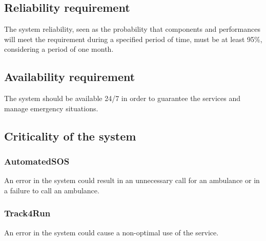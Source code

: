 \subsection{Reliability requirement}
The system reliability, seen as the probability that components and performances will meet the requirement during a specified period of time, must be at least 95\%, considering a period of one month.

\subsection{Availability requirement}
The system should be available 24/7 in order to guarantee the services and manage emergency situations.

\subsection{Criticality of the system}
\subsubsection{AutomatedSOS}
An error in the system could result in an unnecessary call for an ambulance or in a failure to call an ambulance.
\subsubsection{Track4Run}
An error in the system could cause a non-optimal use of the service.

